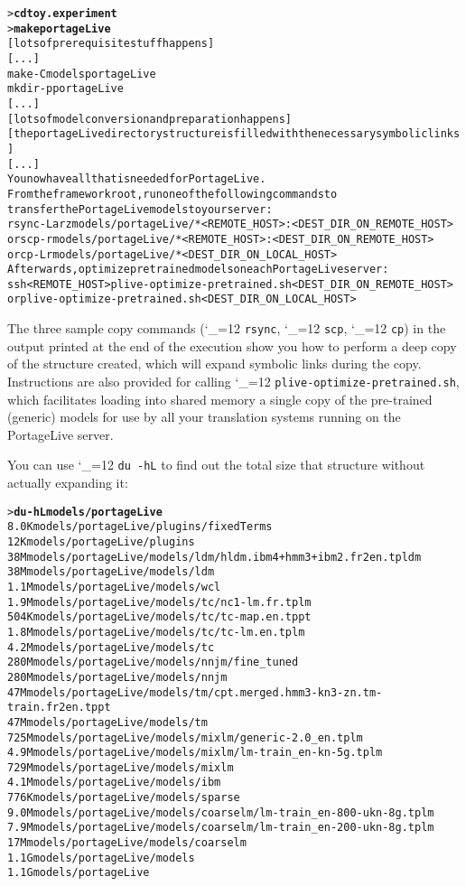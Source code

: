 \documentclass[11pt,letterpaper]{article}
\def\code{\begingroup\catcode`\_=12 \codex}
\newcommand{\codex}[1]{\texttt{#1}\endgroup}
\begin{document}
\begin{small}
\begin{alltt}
   > \textbf{cd toy.experiment}
   > \textbf{make portageLive}
   [lots of prerequisite stuff happens]
   [...]
   make -C models portageLive
   mkdir -p portageLive
   [...]
   [lots of model conversion and preparation happens]
   [the portageLive directory structure is filled with the necessary symbolic links]
   [...]
   You now have all that is needed for PortageLive.
   From the framework root, run one of the following commands to
   transfer the PortageLive models to your server:
        rsync -Larz models/portageLive/* <REMOTE_HOST>:<DEST_DIR_ON_REMOTE_HOST>
   or   scp -r models/portageLive/* <REMOTE_HOST>:<DEST_DIR_ON_REMOTE_HOST>
   or   cp -Lr models/portageLive/* <DEST_DIR_ON_LOCAL_HOST>
   Afterwards, optimize pretrained models on each PortageLive server:
        ssh <REMOTE_HOST> plive-optimize-pretrained.sh <DEST_DIR_ON_REMOTE_HOST>
   or   plive-optimize-pretrained.sh <DEST_DIR_ON_LOCAL_HOST>
\end{alltt}
\end{small}

The three sample copy commands (\code{rsync}, \code{scp}, \code{cp}) in the
output printed at the end of the execution show you how to perform a deep copy
of the structure created, which will expand symbolic links during the copy.
Instructions are also provided for calling \code{plive-optimize-pretrained.sh},
which facilitates loading into shared memory a single copy of the pre-trained
(generic) models for use by all your translation systems running on the
PortageLive server.

You can use \code{du -hL} to find out the total size that structure without
actually expanding it:
\begin{small}
\begin{alltt}
   > \textbf{du -hL models/portageLive}
   8.0K    models/portageLive/plugins/fixedTerms
   12K     models/portageLive/plugins
   38M     models/portageLive/models/ldm/hldm.ibm4+hmm3+ibm2.fr2en.tpldm
   38M     models/portageLive/models/ldm
   1.1M    models/portageLive/models/wcl
   1.9M    models/portageLive/models/tc/nc1-lm.fr.tplm
   504K    models/portageLive/models/tc/tc-map.en.tppt
   1.8M    models/portageLive/models/tc/tc-lm.en.tplm
   4.2M    models/portageLive/models/tc
   280M    models/portageLive/models/nnjm/fine_tuned
   280M    models/portageLive/models/nnjm
   47M     models/portageLive/models/tm/cpt.merged.hmm3-kn3-zn.tm-train.fr2en.tppt
   47M     models/portageLive/models/tm
   725M    models/portageLive/models/mixlm/generic-2.0_en.tplm
   4.9M    models/portageLive/models/mixlm/lm-train_en-kn-5g.tplm
   729M    models/portageLive/models/mixlm
   4.1M    models/portageLive/models/ibm
   776K    models/portageLive/models/sparse
   9.0M    models/portageLive/models/coarselm/lm-train_en-800-ukn-8g.tplm
   7.9M    models/portageLive/models/coarselm/lm-train_en-200-ukn-8g.tplm
   17M     models/portageLive/models/coarselm
   1.1G    models/portageLive/models
   1.1G    models/portageLive
\end{alltt}
\end{small}
\end{document}
